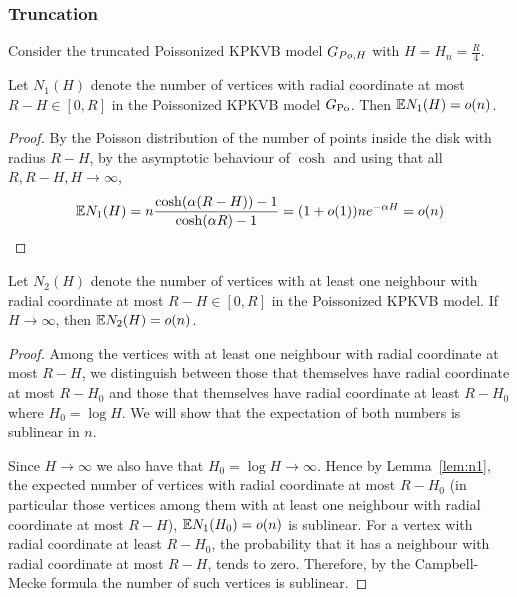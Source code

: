 \subsubsection{Truncation}
Consider the truncated Poissonized KPKVB model $G_{Po,H}$ with $H =H_n= \frac{R}{4}$.
\begin{lemma}\label{lem:n1}
Let $N_1(H)$ denote the number of vertices with radial coordinate at most $R-H \in [0,R]$ in the Poissonized KPKVB model $G_{\text{Po}}$. Then $\mathbb{E} N_1(H) = o(n)$.%
\end{lemma}
\begin{proof}
By the Poisson distribution of the number of points inside the disk with radius $R-H$, by the asymptotic behaviour of $\cosh$ and using that all $R, R-H, H \rightarrow \infty$,
\begin{align*}
\mathbb{E} N_1(H) = n \frac{\cosh(\alpha(R-H))-1}{\cosh(\alpha R) -1} = (1+o(1)) n e^{-\alpha H} = o(n)
\end{align*}
\end{proof}
\begin{lemma}\label{lem:n2}
Let $N_2(H)$ denote the number of vertices with at least one neighbour with radial coordinate at most $R-H \in [0,R]$ in the Poissonized KPKVB model. If $H \rightarrow \infty$, then $\mathbb{E} N_2(H) = o(n)$.
\end{lemma}
\begin{proof}
Among the vertices with at least one neighbour with radial coordinate at most $R-H$, we distinguish between those that themselves have radial coordinate at most $R-H_0$ and those that themselves have radial coordinate at least $R-H_0$ where $H_0 = \log H$. We will show that the expectation of both numbers is sublinear in $n$.

Since $H \rightarrow \infty$ we also have that $H_0 = \log H \rightarrow \infty$. Hence by Lemma~\ref{lem:n1}, the expected number of vertices with radial coordinate at most $R-H_0$ (in particular those vertices among them with at least one neighbour with radial coordinate at most $R-H$), $\mathbb{E} N_1(H_0) = o(n)$ is sublinear. For a vertex with radial coordinate at least $R-H_0$, the probability that it has a neighbour with radial coordinate at most $R-H$, tends to zero. Therefore, by the Campbell-Mecke formula the number of such vertices is sublinear.
\end{proof}

